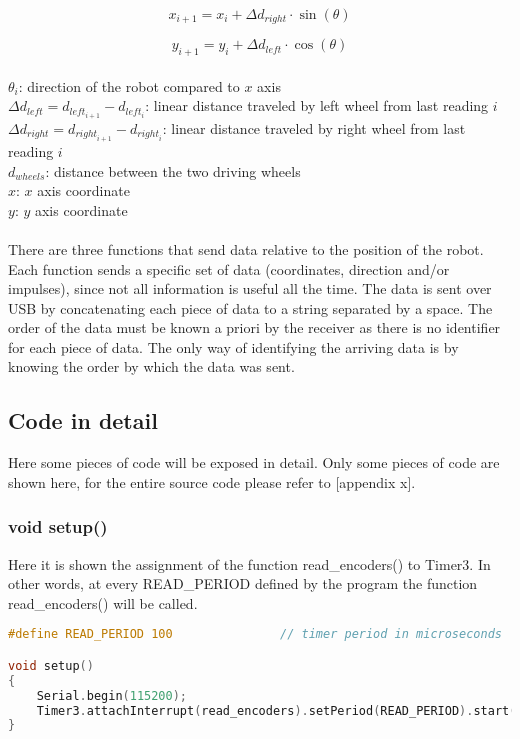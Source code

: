 \begin{equation}
    x_{i + 1} = x_{i} + \Delta d_{right} \cdot \sin(\theta)
\end{equation}

\begin{equation}
    y_{i + 1} = y_{i} + \Delta d_{left} \cdot \cos(\theta)
\end{equation}
\\
$\theta_{i}$: direction of the robot compared to $x$ axis
\\
$\Delta d_{left} = d_{{left}_{i+1}} - d_{{left}_{i}}$: linear distance traveled by left wheel from last reading $i$
\\
$\Delta d_{right} = d_{{right}_{i+1}} - d_{{right}_{i}}$: linear distance traveled by right wheel from last reading $i$
\\
$d_{wheels}$: distance between the two driving wheels
\\
$x$: $x$ axis coordinate
\\
$y$: $y$ axis coordinate
\\ \\
There are three functions that send data relative to the position of the robot. Each function sends a specific set of data (coordinates, direction and/or impulses), since not all information is useful all the time. The data is sent 
over USB by concatenating each piece of data to a string separated by a space. The order of the data must be known a priori by the receiver as there is no identifier for each piece of data. The only way of identifying the arriving 
data is by knowing the order by which the data was sent.

\subsection{Code in detail}
Here some pieces of code will be exposed in detail. Only some pieces of code are shown here, for the entire source code please refer to [appendix x].

\subsubsection{void setup()}
Here it is shown the assignment of the function read\_encoders() to Timer3. In other words, at every READ\_PERIOD defined by the program the function read\_encoders() will be called.

\begin{lstlisting}[language=C]
#define READ_PERIOD 100               // timer period in microseconds

void setup()
{
    Serial.begin(115200);
    Timer3.attachInterrupt(read_encoders).setPeriod(READ_PERIOD).start();
}
\end{lstlisting}


